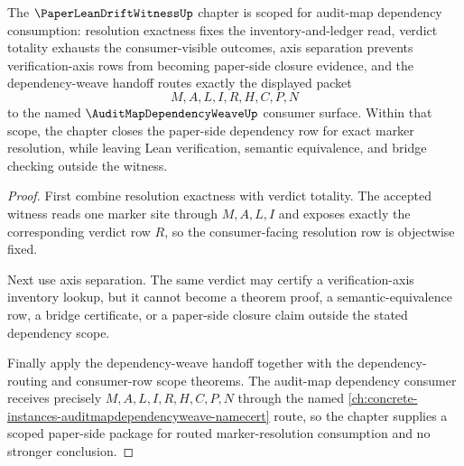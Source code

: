 \begin{theorem}
\label{thm:paper-lean-drift-witness-scoped-closure-package}
The $\PaperLeanDriftWitnessUp$ chapter is scoped for audit-map dependency consumption: resolution exactness fixes the inventory-and-ledger read, verdict totality exhausts the consumer-visible outcomes, axis separation prevents verification-axis rows from becoming paper-side closure evidence, and the dependency-weave handoff routes exactly the displayed packet
$$
M,A,L,I,R,H,C,P,N
$$
to the named $\AuditMapDependencyWeaveUp$ consumer surface. Within that scope, the chapter closes the paper-side dependency row for exact marker resolution, while leaving Lean verification, semantic equivalence, and bridge checking outside the witness.
\end{theorem}
\begin{proof}
First combine resolution exactness with verdict totality. The accepted witness reads one marker site through $M,A,L,I$ and exposes exactly the corresponding verdict row $R$, so the consumer-facing resolution row is objectwise fixed.

Next use axis separation. The same verdict may certify a verification-axis inventory lookup, but it cannot become a theorem proof, a semantic-equivalence row, a bridge certificate, or a paper-side closure claim outside the stated dependency scope.

Finally apply the dependency-weave handoff together with the dependency-routing and consumer-row scope theorems. The audit-map dependency consumer receives precisely $M,A,L,I,R,H,C,P,N$ through the named \autoref{ch:concrete-instances-auditmapdependencyweave-namecert} route, so the chapter supplies a scoped paper-side package for routed marker-resolution consumption and no stronger conclusion.
\end{proof}

